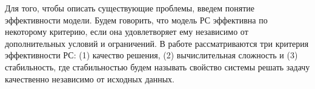 %
%
%



Для того, чтобы описать существующие проблемы,
введем понятие эффективности модели.
Будем говорить, что модель РС эффективна по некоторому критерию, если она
удовлетворяет ему независимо от дополнительных условий и ограничений.
В работе рассматриваются три критерия эффективности РС: (1) качество
решения, (2) вычислительная сложность и (3) стабильность, где стабильностью
будем называть свойство системы решать задачу качественно независимо
от исходных данных.

